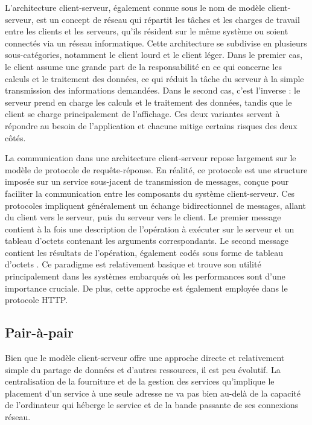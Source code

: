 L'architecture client-serveur, également connue sous le nom de modèle client-serveur, est un concept de réseau qui répartit les tâches et les charges de travail entre les clients et les serveurs, qu'ils résident sur le même système ou soient connectés via un réseau informatique. Cette architecture se subdivise en plusieurs sous-catégories, notamment le client lourd et le client léger. Dans le premier cas, le client assume une grande part de la responsabilité en ce qui concerne les calculs et le traitement des données, ce qui réduit la tâche du serveur à la simple transmission des informations demandées. Dans le second cas, c'est l'inverse : le serveur prend en charge les calculs et le traitement des données, tandis que le client se charge principalement de l'affichage. Ces deux variantes servent à répondre au besoin de l'application et chacune mitige certains risques des deux côtés.

La communication dans une architecture client-serveur repose largement sur le modèle de protocole de requête-réponse. En réalité, ce protocole est une structure imposée sur un service sous-jacent de transmission de messages, conçue pour faciliter la communication entre les composants du système client-serveur. Ces protocoles impliquent généralement un échange bidirectionnel de messages, allant du client vers le serveur, puis du serveur vers le client. Le premier message contient à la fois une description de l'opération à exécuter sur le serveur et un tableau d'octets contenant les arguments correspondants. Le second message contient les résultats de l'opération, également codés sous forme de tableau d'octets \cite{Coulouris_2012}. Ce paradigme est relativement basique et trouve son utilité principalement dans les systèmes embarqués où les performances sont d'une importance cruciale. De plus, cette approche est également employée dans le protocole HTTP.

\subsection{Pair-à-pair}

Bien que le modèle client-serveur offre une approche directe et relativement simple du partage de données et d'autres ressources, il est peu évolutif. La centralisation de la fourniture et de la gestion des services qu'implique le placement d'un service à une seule adresse ne va pas bien au-delà de la capacité de l'ordinateur qui héberge le service et de la bande passante de ses connexions réseau.

